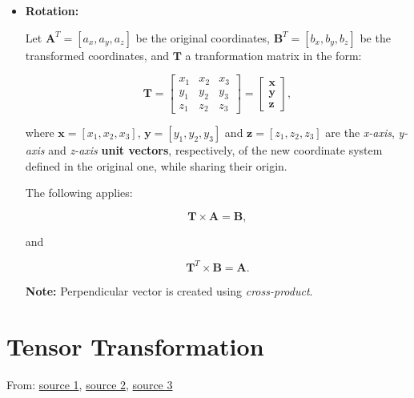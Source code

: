 \begin{itemize}
    \item \textbf{Rotation:}

        Let $\mathbf{A}^{T} = [a_{x}, a_{y}, a_{z}]$ be the original coordinates,
        $\mathbf{B}^{T} = [b_{x}, b_{y}, b_{z}]$ be the transformed coordinates, and
        $\mathbf{T}$ a tranformation matrix in the form:

        \begin{equation}
            \mathbf{T} = \begin{bmatrix}
                x_1 & x_2 & x_3 \\
                y_1 & y_2 & y_3 \\
                z_1 & z_2 & z_3
            \end{bmatrix} = \begin{bmatrix}
                \mathbf{x} \\
                \mathbf{y} \\
                \mathbf{z}
            \end{bmatrix}
        ,\end{equation}

        where $\mathbf{x} = [x_1, x_2, x_3]$, $\mathbf{y} = [y_1, y_2, y_3]$ and
        $\mathbf{z} = [z_1, z_2, z_3]$ are the \textit{x-axis}, \textit{y-axis} and
        \textit{z-axis} \textbf{unit vectors}, respectively, of the new coordinate
        system defined in the original one, while sharing their origin.

        The following applies:

        \begin{equation}
            \mathbf{T} \times \mathbf{A} = \mathbf{B}
        ,\end{equation}

        and

        \begin{equation}
            \mathbf{T}^{T} \times \mathbf{B} = \mathbf{A}
        .\end{equation}

        \textbf{Note:} Perpendicular vector is  created using \textit{cross-product}.
\end{itemize}


\section{Tensor Transformation}

From:
\href{https://wp.optics.arizona.edu/optomech/wp-content/uploads/sites/53/2016/10/OPTI_222_W21.pdf}{source 1},
\href{https://www.continuummechanics.org/principalstressesandstrains.html}{source 2},
\href{https://www.ecourses.ou.edu/cgi-bin/eBook.cgi?doc=&topic=me&chap_sec=07.2&page=theory}{source 3}


